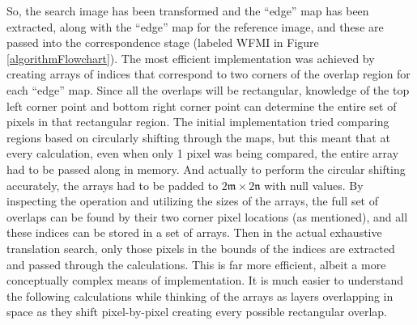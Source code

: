 So, the search image has been transformed and the ``edge'' map has been extracted, along with the ``edge'' map for the reference image, and these are passed into the correspondence stage (labeled WFMI in Figure \ref{algorithmFlowchart}). The most efficient implementation was achieved by creating arrays of indices that correspond to two corners of the overlap region for each ``edge'' map. Since all the overlaps will be rectangular, knowledge of the top left corner point and bottom right corner point can determine the entire set of pixels in that rectangular region. The initial implementation tried comparing regions based on circularly shifting through the maps, but this meant that at every calculation, even when only 1 pixel was being compared, the entire array had to be passed along in memory. And actually to perform the circular shifting accurately, the arrays had to be padded to $2\mathfrak{m} \times 2\mathfrak{n}$ with null values. By inspecting the operation and utilizing the sizes of the arrays, the full set of overlaps can be found by their two corner pixel locations (as mentioned), and all these indices can be stored in a set of arrays. Then in the actual exhaustive translation search, only those pixels in the bounds of the indices are extracted and passed through the calculations. This is far more efficient, albeit a more conceptually complex means of implementation. It is much easier to understand the following calculations while thinking of the arrays as layers overlapping in space as they shift pixel-by-pixel creating every possible rectangular overlap.

